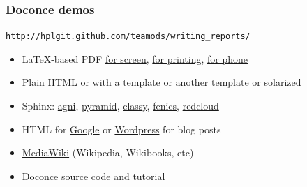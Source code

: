 \documentclass{beamer}
\newcounter{doconce:exercise:counter}
\newcounter{doconce:movie:counter}
\begin{document}
\begin{frame}
\frametitle{Doconce demos}

\href{{http://hplgit.github.com/teamods/writing_reports/}}{\nolinkurl{http://hplgit.github.com/teamods/writing_reports/}}

\begin{itemize}
 \item LaTeX-based PDF \href{{http://hplgit.github.com/teamods/writing_reports/_static/report.pdf}}{for screen}, \href{{http://hplgit.github.com/teamods/writing_reports/_static/report_4printing.pdf}}{for printing}, \href{{http://hplgit.github.com/teamods/writing_reports/_static/report_4phone.pdf}}{for phone}

 \item \href{{http://hplgit.github.com/teamods/writing_reports/_static/report_do.html}}{Plain HTML} or with a \href{{http://hplgit.github.com/teamods/writing_reports/_static/report_vagrant.html}}{template} or \href{{http://hplgit.github.com/teamods/writing_reports/_static/report_github_minimal.html}}{another template} or \href{{http://hplgit.github.com/teamods/writing_reports/_static/report_solarized.html}}{solarized}

 \item Sphinx: \href{{http://hplgit.github.com/teamods/writing_reports/_static/sphinx-agni/index.html}}{agni}, \href{{http://hplgit.github.com/teamods/writing_reports/_static/sphinx-pyramid/report.html}}{pyramid}, \href{{http://hplgit.github.com/teamods/writing_reports/_static/sphinx-classy/report.html}}{classy}, \href{{http://hplgit.github.com/teamods/writing_reports/_static/sphinx-fenics_minimal/report.html}}{fenics}, \href{{http://hplgit.github.com/teamods/writing_reports/_static/sphinx-redcloud/report.html}}{redcloud}

 \item HTML for \href{{http://doconce-report-demo.blogspot.no/}}{Google} or \href{{http://doconcereportdemo.wordpress.com/}}{Wordpress} for blog posts

 \item \href{{http://doconcedemo.shoutwiki.com/wiki/Doconce_demo_page}}{MediaWiki} (Wikipedia, Wikibooks, etc)

 \item Doconce \href{{http://hplgit.github.com/teamods/writing_reports/_static/report.do.txt.html}}{source code} and \href{{http://hplgit.github.io/doconce/doc/pub/tutorial/html/index.html}}{tutorial}
\end{itemize}

\noindent
\end{frame}
\end{document}
